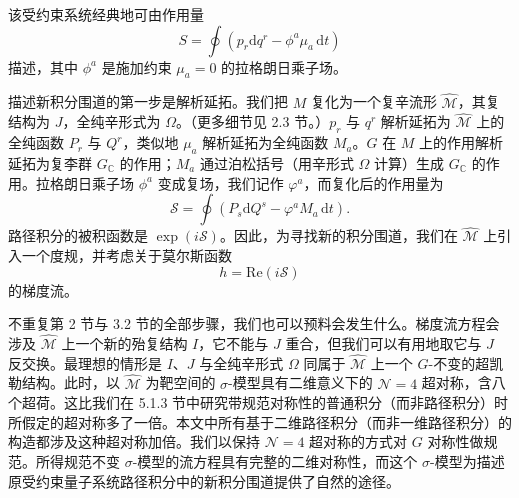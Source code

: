 \documentclass[11pt,a4paper,UTF8]{ctexart}
\theoremstyle{plain}
\theoremstyle{definition}
\begin{document}
该受约束系统经典地可由作用量
\begin{equation}
    S=\oint\left(p_r\mathrm{d}q^r-\phi^a\mu_a\,\mathrm{d}t\right)
    \tag{5.47}
\end{equation}
描述，其中 $\phi^a$ 是施加约束 $\mu_a=0$ 的拉格朗日乘子场。


描述新积分围道的第一步是解析延拓。我们把 $M$ 复化为一个复辛流形 $\widehat{\mathcal{M}}$，其复结构为 $J$，全纯辛形式为 $\Omega$。（更多细节见 2.3 节。）$p_r$ 与 $q^r$ 解析延拓为 $\widehat{\mathcal{M}}$ 上的全纯函数 $P_r$ 与 $Q^r$，类似地 $\mu_a$ 解析延拓为全纯函数 $M_a$。$G$ 在 $M$ 上的作用解析延拓为复李群 $G_{\mathbb{C}}$ 的作用；$M_a$ 通过泊松括号（用辛形式 $\Omega$ 计算）生成 $G_{\mathbb{C}}$ 的作用。拉格朗日乘子场 $\phi^a$ 变成复场，我们记作 $\varphi^a$，而复化后的作用量为
\begin{equation}
    \mathcal{S}=\oint\left(P_s\mathrm{d}Q^s-\varphi^a M_a\,\mathrm{d}t\right).
    \tag{5.48}
\end{equation}
路径积分的被积函数是 $\exp(i\mathcal{S})$。因此，为寻找新的积分围道，我们在 $\widehat{\mathcal{M}}$ 上引入一个度规，并考虑关于莫尔斯函数
\begin{equation}
    h=\mathrm{Re}(i\mathcal{S})
    \tag{5.49}
\end{equation}
的梯度流。


不重复第 2 节与 3.2 节的全部步骤，我们也可以预料会发生什么。梯度流方程会涉及 $\widehat{\mathcal{M}}$ 上一个新的殆复结构 $I$，它不能与 $J$ 重合，但我们可以有用地取它与 $J$ 反交换。最理想的情形是 $I$、$J$ 与全纯辛形式 $\Omega$ 同属于 $\widehat{\mathcal{M}}$ 上一个 $G$-不变的超凯勒结构。此时，以 $\widehat{\mathcal{M}}$ 为靶空间的 $\sigma$-模型具有二维意义下的 $\mathcal{N}=4$ 超对称，含八个超荷。这比我们在 5.1.3 节中研究带规范对称性的普通积分（而非路径积分）时所假定的超对称多了一倍。本文中所有基于二维路径积分（而非一维路径积分）的构造都涉及这种超对称加倍。我们以保持 $\mathcal{N}=4$ 超对称的方式对 $G$ 对称性做规范。所得规范不变 $\sigma$-模型的流方程具有完整的二维对称性，而这个 $\sigma$-模型为描述原受约束量子系统路径积分中的新积分围道提供了自然的途径。
\end{document}
